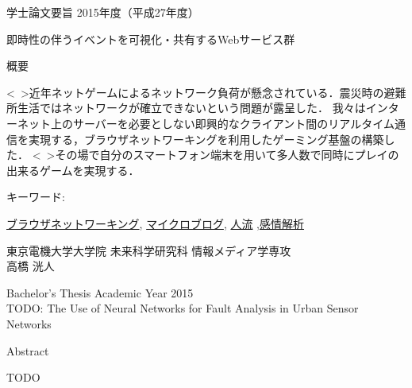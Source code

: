 \newpage
\pagestyle{plain}
\begin{center}
\LARGE{学士論文要旨 \hspace{10mm} 2015年度（平成27年度）}\\

\vspace{10mm}

\LARGE{即時性の伴うイベントを可視化・共有するWebサービス群}\\
\end{center}

\begin{center}
概要\\
\end{center}

<\ >近年ネットゲームによるネットワーク負荷が懸念されている．震災時の避難所生活ではネットワークが確立できないという問題が露呈した．
我々はインターネット上のサーバーを必要としない即興的なクライアント間のリアルタイム通信を実現する，ブラウザネットワーキングを利用したゲーミング基盤の構築した．
<\ >その場で自分のスマートフォン端末を用いて多人数で同時にプレイの出来るゲームを実現する．

\begin{flushleft}キーワード:\\
\end{flushleft}
{\underline{ブラウザネットワーキング}, \underline{マイクロブログ}, \underline{人流} ,\underline{感情解析} }


\begin{center}
\vspace{10mm}
\begin{flushright}\large 東京電機大学大学院 未来科学研究科 情報メディア学専攻\\
\LARGE 高橋 洸人\\
\end{flushright}
\end{center}

\newpage

\begin{center}
\LARGE{Bachelor's Thesis Academic Year 2015}\\

\vspace{10mm}
\LARGE{TODO: The Use of Neural Networks for Fault Analysis in Urban Sensor Networks}\\
\end{center}
\begin{center}
Abstract\\
\end{center}
TODO
\\\\

